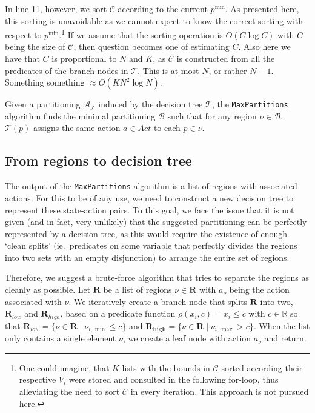 In line 11, however, we sort $\mathcal{C}$ according to the current $p^{\min}$.
As presented here, this sorting is unavoidable as we cannot expect to know the
correct sorting with respect to $p^{\min}$.\footnote{%
    One could imagine, that $K$ lists with the bounds in $\mathcal{C}$ sorted
    according their respective $V_i$ were stored and consulted in the following
    for-loop, thus alleviating the need to sort $\mathcal{C}$ in every
    iteration. This approach is not pursued here.
} If we assume that the sorting operation is $O(C\log C)$ with $C$ being the
size of $\mathcal{C}$, then question becomes one of estimating $C$. Also here we
have that $C$ is proportional to $N$ and $K$, as $\mathcal{C}$ is constructed
from all the predicates of the branch nodes in $\mathcal{T}$. This is at most
$N$, or rather $N-1$. Something something $\approx O(KN^2\log N)$.

\begin{theorem}
    Given a partitioning $\mathcal{A}_{\mathcal{T}}$ induced by the decision
    tree $\mathcal{T}$, the \texttt{MaxPartitions} algorithm finds the minimal
    partitioning $\mathcal{B}$ such that for any region $\nu \in \mathcal{B}$,
    $\mathcal{T}(p)$ assigns the same action $a \in Act$ to each $p \in \nu$.
\end{theorem}

\subsection{From regions to decision tree}%
\label{sub:regionsToDT}

The output of the \texttt{MaxPartitions} algorithm is a list of regions with
associated actions. For this to be of any use, we need to construct a new
decision tree to represent these state-action pairs. To this goal, we face the
issue that it is not given (and in fact, very unlikely) that the suggested
partitioning can be perfectly represented by a decision tree, as this would
require the existence of enough `clean splits' (ie.\ predicates on some variable
that perfectly divides the regions into two sets with an empty disjunction) to
arrange the entire set of regions.

Therefore, we suggest a brute-force algorithm that tries to separate the regions
as cleanly as possible. Let $\mathbf{R}$ be a list of regions $\nu \in
\mathbf{R}$ with $a_{\nu}$ being the action associated with $\nu$. We
iteratively create a branch node that splits $\mathbf{R}$ into two,
$\mathbf{R}_{low}$ and $\mathbf{R}_{high}$, based on a predicate function
$\rho(x_i,c) = x_i \le c$ with $c \in \mathbb{R}$ so that $\mathbf{R}_{low} = \{
\nu \in \mathbf{R} \mid \nu_{i,\min} \le c \}$ and $\mathbf{R_{high}} = \{ \nu
\in \mathbf{R} \mid \nu_{i,\max} > c \}$. When the list only contains a single
element $\nu$, we create a leaf node with action $a_{\nu}$ and return.

